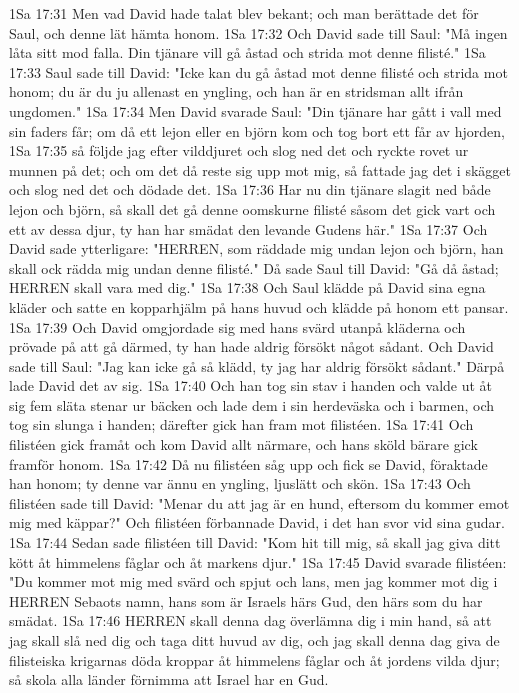 1Sa 17:31  Men vad David hade talat blev bekant; och man berättade det för Saul, och denne lät hämta honom.
1Sa 17:32  Och David sade till Saul: "Må ingen låta sitt mod falla. Din tjänare vill gå åstad och strida mot denne filisté."
1Sa 17:33  Saul sade till David: "Icke kan du gå åstad mot denne filisté och strida mot honom; du är du ju allenast en yngling, och han är en stridsman allt ifrån ungdomen."
1Sa 17:34  Men David svarade Saul: "Din tjänare har gått i vall med sin faders får; om då ett lejon eller en björn kom och tog bort ett får av hjorden,
1Sa 17:35  så följde jag efter vilddjuret och slog ned det och ryckte rovet ur munnen på det; och om det då reste sig upp mot mig, så fattade jag det i skägget och slog ned det och dödade det.
1Sa 17:36  Har nu din tjänare slagit ned både lejon och björn, så skall det gå denne oomskurne filisté såsom det gick vart och ett av dessa djur, ty han har smädat den levande Gudens här."
1Sa 17:37  Och David sade ytterligare: "HERREN, som räddade mig undan lejon och björn, han skall ock rädda mig undan denne filisté." Då sade Saul till David: "Gå då åstad; HERREN skall vara med dig."
1Sa 17:38  Och Saul klädde på David sina egna kläder och satte en kopparhjälm på hans huvud och klädde på honom ett pansar.
1Sa 17:39  Och David omgjordade sig med hans svärd utanpå kläderna och prövade på att gå därmed, ty han hade aldrig försökt något sådant. Och David sade till Saul: "Jag kan icke gå så klädd, ty jag har aldrig försökt sådant." Därpå lade David det av sig.
1Sa 17:40  Och han tog sin stav i handen och valde ut åt sig fem släta stenar ur bäcken och lade dem i sin herdeväska och i barmen, och tog sin slunga i handen; därefter gick han fram mot filistéen.
1Sa 17:41  Och filistéen gick framåt och kom David allt närmare, och hans sköld bärare gick framför honom.
1Sa 17:42  Då nu filistéen såg upp och fick se David, föraktade han honom; ty denne var ännu en yngling, ljuslätt och skön.
1Sa 17:43  Och filistéen sade till David: "Menar du att jag är en hund, eftersom du kommer emot mig med käppar?" Och filistéen förbannade David, i det han svor vid sina gudar.
1Sa 17:44  Sedan sade filistéen till David: "Kom hit till mig, så skall jag giva ditt kött åt himmelens fåglar och åt markens djur."
1Sa 17:45  David svarade filistéen: "Du kommer mot mig med svärd och spjut och lans, men jag kommer mot dig i HERREN Sebaots namn, hans som är Israels härs Gud, den härs som du har smädat.
1Sa 17:46  HERREN skall denna dag överlämna dig i min hand, så att jag skall slå ned dig och taga ditt huvud av dig, och jag skall denna dag giva de filisteiska krigarnas döda kroppar åt himmelens fåglar och åt jordens vilda djur; så skola alla länder förnimma att Israel har en Gud.
